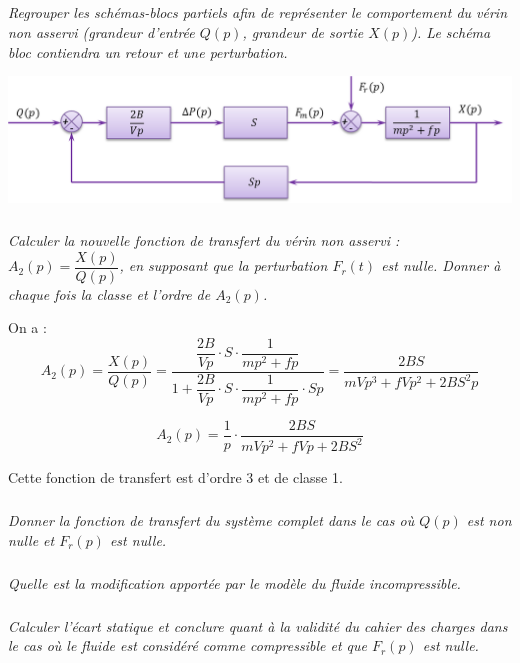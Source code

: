 \documentclass[10pt,fleqn]{article} %
\begin{document}
\begin{multicols}{2}
\begin{corrige}
\end{corrige}
\else \fi

\subparagraph{}
\textit{Regrouper les schémas-blocs partiels afin de représenter le comportement du vérin non asservi (grandeur d'entrée $Q(p)$, grandeur de sortie $X(p)$). Le schéma bloc contiendra un retour et une perturbation.}
\ifprof
\begin{corrige}
\begin{center}
\includegraphics[width=.8\linewidth]{images/schema_bloc_2}
\end{center}
\end{corrige}
\else \fi

\subparagraph{}
\textit{Calculer la nouvelle fonction de transfert du vérin non asservi : $A_2(p)=\dfrac{X(p)}{Q(p)}$, en supposant que la perturbation $F_r(t)$ est nulle. Donner à chaque fois la classe et l'ordre de $A_2(p)$.}
\ifprof
\begin{corrige}
On a : 
$$A_2(p)
=\dfrac{X(p)}{Q(p)}
=\dfrac{\dfrac{2B}{Vp}\cdot S\cdot\dfrac{1}{mp^2+fp}}{1+\dfrac{2B}{Vp}\cdot S\cdot\dfrac{1}{mp^2+fp}\cdot Sp}
=\dfrac{2BS}{mVp^3+fVp^2+2BS^2p}
$$

$$A_2(p)
=\dfrac{1}{p}\cdot\dfrac{2BS}{mVp^2+fVp+2BS^2}
$$

Cette fonction de transfert est d'ordre 3 et de classe 1.
\end{corrige}
\else \fi

\subparagraph{}
\textit{Donner la fonction de transfert du système complet dans le cas où $Q(p)$ est non nulle et $F_r(p)$  est nulle.}
\ifprof
\begin{corrige}
\end{corrige}
\else \fi

\subparagraph{}
\textit{Quelle est la modification apportée par le modèle du fluide incompressible.}
\ifprof
\begin{corrige}
\end{corrige}
\else \fi

\subparagraph{}
\textit{Calculer l'écart statique et conclure quant à la validité du cahier des charges dans le cas où le fluide est considéré comme compressible et que $F_r(p)$ est nulle.}
\ifprof
\begin{corrige}
\end{corrige}
\else 


\end{multicols}
\end{document}
